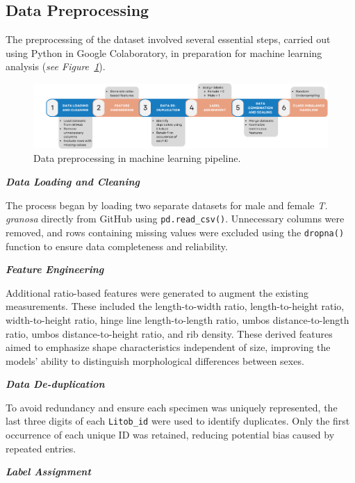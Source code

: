 \newpage
\subsection{Data Preprocessing}
\label{sec:pre-processing}

The preprocessing of the dataset involved several essential steps, carried out using Python in Google Colaboratory, in preparation for machine learning analysis (\textit{see Figure~\ref{fig:pipeline}}).

\begin{figure}[!htbp]
	\centering
	\includegraphics[width=1\textwidth]{figures/pipeline.png}
	\caption{Data preprocessing in machine learning pipeline.}
	\label{fig:pipeline}
\end{figure}

\textbf{\textit{Data Loading and Cleaning}}

The process began by loading two separate datasets for male and female \textit{T. granosa} directly from GitHub using \texttt{pd.read\_csv()}. Unnecessary columns were removed, and rows containing missing values were excluded using the \texttt{dropna()} function to ensure data completeness and reliability.

\textbf{\textit{Feature Engineering}}

Additional ratio-based features were generated to augment the existing measurements. These included the length-to-width ratio, length-to-height ratio, width-to-height ratio, hinge line length-to-length ratio, umbos distance-to-length ratio, umbos distance-to-height ratio, and rib density. These derived features aimed to emphasize shape characteristics independent of size, improving the models' ability to distinguish morphological differences between sexes.

\newpage
\textbf{\textit{Data De-duplication}}

To avoid redundancy and ensure each specimen was uniquely represented, the last three digits of each \texttt{Litob\_id} were used to identify duplicates. Only the first occurrence of each unique ID was retained, reducing potential bias caused by repeated entries.

\textbf{\textit{Label Assignment}}

